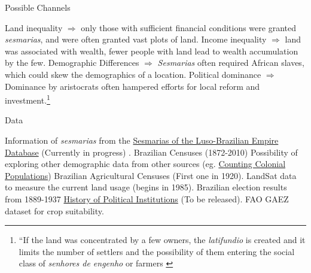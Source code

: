 \documentclass[aspectratio=1610]{beamer}
\begin{document}
\begin{frame}{Possible Channels}
    \begin{outline}
            \1 Land inequality $\Rightarrow$ only those with sufficient financial conditions were granted \textit{sesmarias}, and were often granted vast plots of land.
            \pause 
            \vspace{1mm}
            \1 Income inequality $\Rightarrow$ land was associated with wealth, fewer people with land lead to wealth accumulation by the few.
            \pause 
            \vspace{1mm}
            \1 Demographic Differences $\Rightarrow$ \textit{Sesmarias} often required African slaves, which could skew the demographics of a location.
            \pause 
            \vspace{1mm}
            \1 Political dominance $\Rightarrow$ Dominance by aristocrats often hampered efforts for local reform and investment.\footnote[frame,1]{``If the land was concentrated by a few owners, the \textit{latifundio} is created and it limits the number of settlers and the possibility of them entering the social class of \textit{senhores de engenho} or farmers \parencite[p.~40]{Bandecchi1963-uj}}
    \end{outline}
\end{frame}

\begin{frame}{Data}
    \label{data slide}
    \begin{outline}
        \1 Information of \textit{sesmarias} from the \href{http://plataformasilb.cchla.ufrn.br/}{Sesmarias of the Luso-Brazilian Empire Database} (Currently in progress) 
        \hyperlink{document example}{}
        \hyperlink{data}{}.
        \1 Brazilian Censuses (1872-2010)
            \vspace{1mm}
            \2 Possibility of exploring other demographic data from other sources (eg. \href{http://colonialpopulations.fcsh.unl.pt/mainEnglish.php}{Counting Colonial Populations})
            \vspace{1mm}
        \1 Brazilian Agricultural Censuses (First one in 1920).
        \vspace{2mm}
        \1 LandSat data to measure the current land usage (begins in 1985).
        \vspace{2mm}
        \1 Brazilian election results from 1889-1937 \href{https://projetohipol.wordpress.com/projetos/eleicoes-antes-da-democracia-dados-estatisticos-1889-1937/}{History of Political Institutions} (To be released).
        \vspace{2mm}
        \1 FAO GAEZ dataset for crop suitability.
    \end{outline}
\end{frame}
\end{document}
